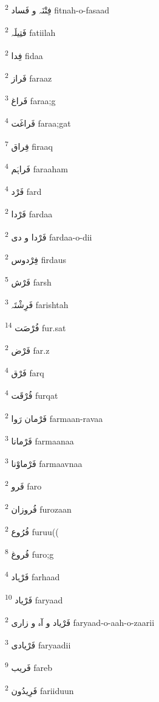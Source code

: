 \documentclass[12pt]{article}
\begin{document}
\begin{RTL}
\begin{multicols}{5}
{\ur فِتْنَہ و فَساد}   \textsuperscript{2} fitnah-o-fasaad

{\ur فَتِیلَہ}   \textsuperscript{2} fatiilah

{\ur فِدا}   \textsuperscript{2} fidaa

{\ur فَراز}   \textsuperscript{2} faraaz

{\ur فَراغ}   \textsuperscript{3} faraa;g

{\ur فَراغَت}   \textsuperscript{4} faraa;gat

{\ur فِراق}   \textsuperscript{7} firaaq

{\ur فَراہَم}   \textsuperscript{4} faraaham

{\ur فَرْد}   \textsuperscript{4} fard

{\ur فَرْدا}   \textsuperscript{2} fardaa

{\ur فَرْدا و دی}   \textsuperscript{2} fardaa-o-dii

{\ur فِرْدوس}   \textsuperscript{2} firdaus

{\ur فَرْش}   \textsuperscript{5} farsh

{\ur فَرِشْتَہ}   \textsuperscript{3} farishtah

{\ur فُرْصَت}   \textsuperscript{14} fur.sat

{\ur فَرْض}   \textsuperscript{2} far.z

{\ur فَرْق}   \textsuperscript{4} farq

{\ur فُرْقَت}   \textsuperscript{4} furqat

{\ur فَرْمان رَوا}   \textsuperscript{2} farmaan-ravaa

{\ur فَرْمانا}   \textsuperscript{3} farmaanaa

{\ur فَرْماوْنا}   \textsuperscript{3} farmaavnaa

{\ur فَرو}   \textsuperscript{2} faro

{\ur فُروزان}   \textsuperscript{2} furozaan

{\ur فُرُوع}   \textsuperscript{2} furuu((

{\ur فُروغ}   \textsuperscript{8} furo;g

{\ur فَرْہاد}   \textsuperscript{4} farhaad

{\ur فَرْیاد}   \textsuperscript{10} faryaad

{\ur فَرْیاد و آہ و زاری}   \textsuperscript{2} faryaad-o-aah-o-zaarii

{\ur فَرْیادی}   \textsuperscript{3} faryaadii

{\ur فَریب}   \textsuperscript{9} fareb

{\ur فَرِیدُون}   \textsuperscript{2} fariiduun


\end{multicols}
\end{RTL}
\end{document}
